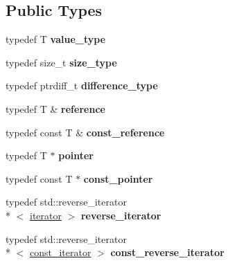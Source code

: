 \subsection*{Public Types}
\begin{DoxyCompactItemize}
\item 
\hypertarget{classcircularDeque_a66d20170aa8291ac73957425ee65ad2d}{typedef T {\bfseries value\+\_\+type}}\label{classcircularDeque_a66d20170aa8291ac73957425ee65ad2d}

\item 
\hypertarget{classcircularDeque_a3c2de6140255c3eca77ae7ddf7a87b33}{typedef size\+\_\+t {\bfseries size\+\_\+type}}\label{classcircularDeque_a3c2de6140255c3eca77ae7ddf7a87b33}

\item 
\hypertarget{classcircularDeque_aff3c201fa525be5db03b9797523430c4}{typedef ptrdiff\+\_\+t {\bfseries difference\+\_\+type}}\label{classcircularDeque_aff3c201fa525be5db03b9797523430c4}

\item 
\hypertarget{classcircularDeque_aca1b275bb48270cd97307cf3c67e777f}{typedef T \& {\bfseries reference}}\label{classcircularDeque_aca1b275bb48270cd97307cf3c67e777f}

\item 
\hypertarget{classcircularDeque_a7a126488a8eac5a059caddbe0435ec5b}{typedef const T \& {\bfseries const\+\_\+reference}}\label{classcircularDeque_a7a126488a8eac5a059caddbe0435ec5b}

\item 
\hypertarget{classcircularDeque_a1cc9ba44f5882c7d9a9fd329b9654d13}{typedef T $\ast$ {\bfseries pointer}}\label{classcircularDeque_a1cc9ba44f5882c7d9a9fd329b9654d13}

\item 
\hypertarget{classcircularDeque_a2e8ccc232a3181e8af70dbc492edb8c9}{typedef const T $\ast$ {\bfseries const\+\_\+pointer}}\label{classcircularDeque_a2e8ccc232a3181e8af70dbc492edb8c9}

\item 
\hypertarget{classcircularDeque_a8cf82726e6332ba652173706ec1817e8}{typedef std\+::reverse\+\_\+iterator\\*
$<$ \hyperlink{classcircularDeque_1_1iterator}{iterator} $>$ {\bfseries reverse\+\_\+iterator}}\label{classcircularDeque_a8cf82726e6332ba652173706ec1817e8}

\item 
\hypertarget{classcircularDeque_a4dc91726e3f127481fc05f41adc5fad3}{typedef std\+::reverse\+\_\+iterator\\*
$<$ \hyperlink{classcircularDeque_1_1const__iterator}{const\+\_\+iterator} $>$ {\bfseries const\+\_\+reverse\+\_\+iterator}}\label{classcircularDeque_a4dc91726e3f127481fc05f41adc5fad3}

\end{DoxyCompactItemize}
